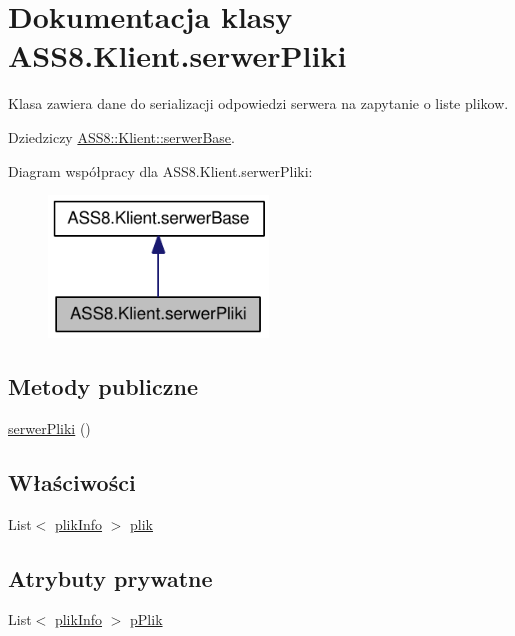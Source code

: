 \hypertarget{a00026}{
\section{Dokumentacja klasy ASS8.Klient.serwerPliki}
\label{d6/d5b/a00026}
}
Klasa zawiera dane do serializacji odpowiedzi serwera na zapytanie o liste plikow.  


Dziedziczy \hyperlink{a00023}{ASS8::Klient::serwerBase}.

Diagram współpracy dla ASS8.Klient.serwerPliki:\nopagebreak
\begin{figure}[H]
\begin{center}
\leavevmode
\includegraphics[width=166pt]{d3/de5/a00209}
\end{center}
\end{figure}
\subsection*{Metody publiczne}
\begin{CompactItemize}
\item 
\hyperlink{a00026_cd11d0671b4895530877a83a471c81ae}{serwerPliki} ()
\end{CompactItemize}
\subsection*{Właściwości}
\begin{CompactItemize}
\item 
List$<$ \hyperlink{a00018}{plikInfo} $>$ \hyperlink{a00026_b6d1b334712037271b25777240056f83}{plik}
\end{CompactItemize}
\subsection*{Atrybuty prywatne}
\begin{CompactItemize}
\item 
List$<$ \hyperlink{a00018}{plikInfo} $>$ \hyperlink{a00026_8d8e172bb33ce06a586d4790c33a41b4}{pPlik}
\end{CompactItemize}



